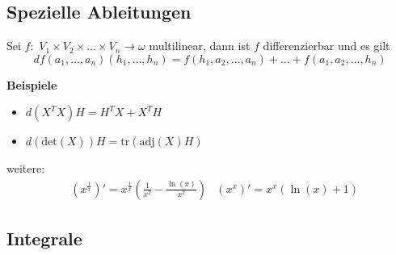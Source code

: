 \documentclass[8pt, a4paper, landscape, fleqn]{scrartcl}
\newenvironment {example}
				{\begin{itshape} \begin{small}}
				{\end{small} \end{itshape}}
\begin{document}
\begin{multicols*}{3}
			\subsection{Spezielle Ableitungen}
				Sei $f:$ $V_1\times V_2 \times \dots \times V_n \rightarrow \omega$ multilinear, dann ist $f$ differenzierbar und es gilt
				\begin{equation*}
					df(a_1, \dots, a_n)(h_1, \dots, h_n)=f(h_1, a_2, \dots, a_n)+\dots+f(a_1, a_2, \dots, h_n)
				\end{equation*}
				\begin{example}
					\textbf{Beispiele}
					\begin{itemize}
						\item $d(X^TX)H=H^TX+X^TH$
						\item $d(\text{det}(X))H=\text{tr}(\text{adj}(X)H)$
					\end{itemize}
				\end{example}
				weitere:
				\vspace{-5pt}
				\begin{align*}
				    &\left(x^\frac{1}{x}\right)'=x^\frac{1}{x}\left(\frac{1}{x^2}-\frac{\ln(x)}{x^2} \right)
				    &\left(x^x\right)'=x^x(\ln(x)+1)
				\end{align*}
			\subsection{Integrale}

\end{multicols*}
\end{document}
